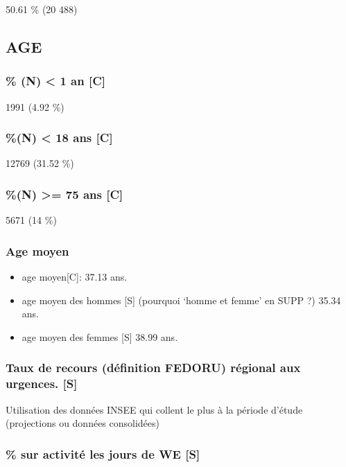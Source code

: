 \documentclass[]{article}
\begin{document}
50.61 \% (20 488)

\subsection{AGE}\label{age}

\subsubsection{\% (N) \textless{} 1 an {[}C{]}}\label{n-1-an-c}

1991 (4.92 \%)

\subsubsection{\%(N) \textless{} 18 ans {[}C{]}}\label{n-18-ans-c}

12769 (31.52 \%)

\subsubsection{\%(N) \textgreater{}= 75 ans {[}C{]}}\label{n-75-ans-c}

5671 (14 \%)

\subsubsection{Age moyen}\label{age-moyen}

\begin{itemize}
\item
  age moyen{[}C{]}: 37.13 ans.
\item
  age moyen des hommes {[}S{]} (pourquoi `homme et femme' en SUPP ?)
  35.34 ans.
\item
  age moyen des femmes {[}S{]} 38.99 ans.
\end{itemize}

\subsubsection{Taux de recours (définition FEDORU) régional aux
urgences.
{[}S{]}}\label{taux-de-recours-definition-fedoru-regional-aux-urgences.-s}

Utilisation des données INSEE qui collent le plus à la période d'étude
(projections ou données consolidées)

\subsubsection{\% sur activité les jours de WE
{[}S{]}}\label{sur-activite-les-jours-de-we-s}
\end{document}
